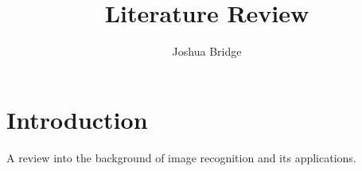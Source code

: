 \documentclass[a4paper,12pt]{article}
\title{Literature Review}
\author{Joshua Bridge}
\begin{document}
\maketitle

\section{Introduction}
    A review into the background of image recognition and its applications.




\end{document}
